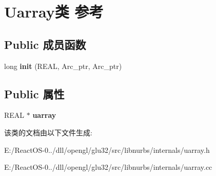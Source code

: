 \hypertarget{class_uarray}{}\section{Uarray类 参考}
\label{class_uarray}
\subsection*{Public 成员函数}
\begin{DoxyCompactItemize}
\item 
\mbox{\label{class_uarray_aa3c8e93dc7d7e1bf52d239bfed549185}} 
long {\bfseries init} (R\+E\+AL, Arc\+\_\+ptr, Arc\+\_\+ptr)
\end{DoxyCompactItemize}
\subsection*{Public 属性}
\begin{DoxyCompactItemize}
\item 
\mbox{\label{class_uarray_a12af9d930642971abdf2538a656fcd3a}} 
R\+E\+AL $\ast$ {\bfseries uarray}
\end{DoxyCompactItemize}


该类的文档由以下文件生成\+:\begin{DoxyCompactItemize}
\item 
E\+:/\+React\+O\+S-\/0../dll/opengl/glu32/src/libnurbs/internals/uarray.\+h\item 
E\+:/\+React\+O\+S-\/0../dll/opengl/glu32/src/libnurbs/internals/uarray.\+cc\end{DoxyCompactItemize}
